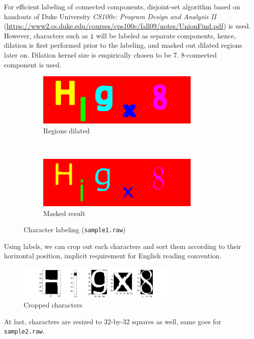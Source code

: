 \documentclass[12pt]{article}
\begin{document}
For efficient labeling of connected components, disjoint-set algorithm based on handouts of Duke University {\it CS100e: Program Design and Analysis II} (\url{https://www2.cs.duke.edu/courses/cps100e/fall09/notes/UnionFind.pdf}) is used. However, characters such as {\tt i} will be labeled as separate components, hence, dilation is first performed prior to the labeling, and masked out dilated regions later on. Dilation kernel size is empirically chosen to be 7. 8-connected component is used.

\begin{figure}[H]
    \centering
    \begin{subfigure}[t]{0.5\textwidth}
        \centering
        \includegraphics[height=1in]{images/sample1_labeled_dilated}
        \caption{Regions dilated}
    \end{subfigure}%
    ~
    \begin{subfigure}[t]{0.5\textwidth}
        \centering
        \includegraphics[height=1in]{images/sample1_labeled_masked}
        \caption{Masked result}
    \end{subfigure}
    \caption{Character labeling ({\tt sample1.raw})}
\end{figure}

Using labels, we can crop out each characters and sort them according to their horizontal position, implicit requirement for English reading convention.

\begin{figure}[H]
    \centering
    \includegraphics[width=0.7\textwidth]{images/sample1_cropped}
    \caption{Cropped characters}
\end{figure}

At last, characters are resized to 32-by-32 squares as well, same goes for {\tt sample2.raw}.
\end{document}
